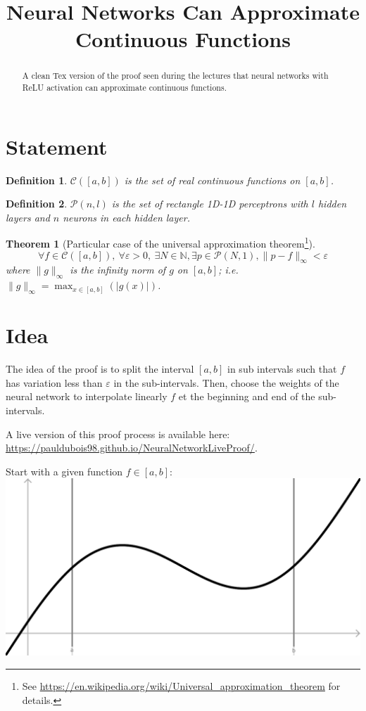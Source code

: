 \documentclass[]{article}
\title{Neural Networks Can Approximate Continuous Functions}
\date{}
\newtheorem*{theorem}{Theorem}
\newtheorem*{definition}{Definition}
\begin{document}
\maketitle

\begin{abstract}
	A clean Tex version of the proof seen during the lectures that neural networks with ReLU activation can approximate continuous functions.
\end{abstract}

\section{Statement}
\begin{definition}
	$\mathcal{C}\left( \left[ a,b \right] \right)$ is the set of real continuous functions on $\left[ a,b \right]$.
\end{definition}
\begin{definition}
	$\mathcal{P}\left( n,l \right)$ is the set of rectangle 1D-1D perceptrons with $l$ hidden layers and $n$ neurons in each hidden layer.
\end{definition}

\begin{theorem}[Particular case of the universal approximation theorem\footnote{See \url{https://en.wikipedia.org/wiki/Universal_approximation_theorem} for details.}]
	$$\forall f \in \mathcal{C}(\left[ a,b \right]), \ \forall \varepsilon > 0, \ \exists N \in \mathbb{N}, \exists p \in \mathcal{P}(N,1), \|p-f\|_\infty < \varepsilon$$
	where $\|g\|_\infty$ is the infinity norm of $g$ on $\left[ a,b \right]$; i.e. $\|g\|_\infty = \max_{x \in \left[ a,b \right]}(|g(x)|)$.
\end{theorem}


\section{Idea}
The idea of the proof is to split the interval $\left[ a,b \right]$ in sub intervals such that $f$ has variation less than $\varepsilon$ in the sub-intervals.
Then, choose the weights of the neural network to interpolate linearly $f$ et the beginning and end of the sub-intervals.

A live version of this proof process is available here:
\url{https://pauldubois98.github.io/NeuralNetworkLiveProof/}.

\newpage
Start with a given function $f \in \left[ a,b \right]$:\newline
\includegraphics[width=\linewidth]{plot_1}
\vspace{1cm}
\end{document}
